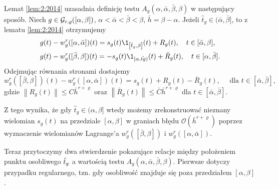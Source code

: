 \documentclass[oik, pdftex, robocza, man]{mgrwms}
\begin{document}
    Lemat \ref{lem:2:2014} uzasadnia definicję testu $A_{g}(\alpha, \bar{\alpha}, \bar{\beta}, \beta)$ w następujący sposób.
    \noindent
    Niech $g \in \mathcal{G}_{r,\varrho}([\alpha,\beta])$, $\alpha<\bar{\alpha}<\bar{\beta}<\beta$, $\bar{h}=\beta-\alpha$. Jeżeli $\hat{t}_{g} \in(\bar{\alpha}, \bar{\beta}]$, to z lematu \ref{lem:2:2014} otrzymujemy
    \begin{equation*}
        \begin{aligned}
            &g(t)-w_{g}^{r}([\alpha, \bar{\alpha}])(t)=s_{g}(t) \1_{\left[\hat{t}_{g}, \beta\right]}(t)+R_{g}(t), \quad t \in[\bar{\alpha}, \beta], \\
            &g(t)-w_{g}^{r}([\bar{\beta}, \beta])(t)=-s_{g}(t) \1_{[\alpha, \hat{t g})}(t)+\bar{R}_{g}(t), \quad t \in[\alpha, \bar{\beta}].
        \end{aligned}
    \end{equation*}
    Odejmując równania stronami dostajemy
    \begin{equation} \label{eq:16}
        w_{g}^{r}([\bar{\beta}, \beta])(t)-w_{g}^{r}([\alpha, \bar{\alpha}])(t)=s_{g}(t)+R_{g}(t)-\bar{R}_{g}(t), \quad \text{ dla }t \in[\bar{\alpha}, \bar{\beta}],
    \end{equation}
    gdzie $\left\|R_{g}(t)\right\| \leq C\bar{h}^{r+\varrho}$ oraz $\left\|\bar{R}_{g}(t)\right\| \leq \bar{C} \bar{h}^{r+\varrho}$ dla $t \in[\bar{\alpha}, \bar{\beta}]$.

    Z tego wynika, że gdy $\hat{t}_{g} \in (\alpha, \beta]$ wtedy możemy zrekonstruować nieznany wielomian $s_{g}(t)$ na przedziale $[\alpha, \beta]$ w graniach błędu $\mathcal{O}(\bar{h}^{r+\varrho})$ poprzez wyznaczenie wielomianów Lagrange'a $w_{g}^{r}([\bar{\beta}, \beta])$ i $w_{g}^{r}([\alpha, \bar{\alpha}])$.

    Teraz przytoczymy dwa stwierdzenie pokazujące relacje między położeniem punktu osobliwego $\hat{t}_{g}$ a wartością testu $A_{g}(\alpha, \bar{\alpha}, \bar{\beta}, \beta)$. Pierwsze dotyczy przypadku regularnego, tzn. gdy osobliwość znajduje się poza przedziałem $[\alpha, \beta]$.
\end{document}
